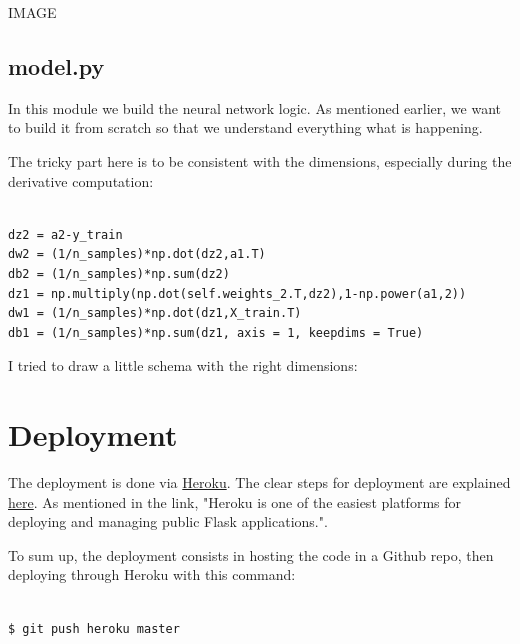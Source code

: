 IMAGE  \\

\subsection{model.py}

In this module we build the neural network logic. As mentioned earlier, we want to build it from scratch so that we understand everything what is happening. 

The tricky part here is to be consistent with the dimensions, especially during the derivative computation:

\lstset{language=Python}
\lstset{frame=lines}
\lstset{basicstyle=\footnotesize}
\begin{lstlisting}

dz2 = a2-y_train
dw2 = (1/n_samples)*np.dot(dz2,a1.T)
db2 = (1/n_samples)*np.sum(dz2)
dz1 = np.multiply(np.dot(self.weights_2.T,dz2),1-np.power(a1,2))
dw1 = (1/n_samples)*np.dot(dz1,X_train.T)
db1 = (1/n_samples)*np.sum(dz1, axis = 1, keepdims = True)

\end{lstlisting}

 I tried to draw a little schema with the right dimensions: \\

\section{Deployment}

The deployment is done via \href{https://www.heroku.com/}{Heroku}. The clear steps for deployment are explained \href{https://dash.plotly.com/deployment}{here}. As mentioned in the link, "Heroku is one of the easiest platforms for deploying and managing public Flask applications.".

To sum up, the deployment consists in hosting the code in a Github repo, then deploying through Heroku with this command:

\lstset{language=bash}
\lstset{frame=lines}
\lstset{basicstyle=\footnotesize}
\begin{lstlisting}

$ git push heroku master

\end{lstlisting}

\vspace{5mm}

